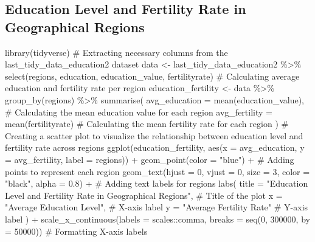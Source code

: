 \documentclass[
  11pt,
  a4paper,
  DIV=11,
  numbers=noendperiod]{scrartcl}
\newenvironment{Shaded}{\begin{snugshade}}{\end{snugshade}}
\newcommand{\AttributeTok}[1]{\textcolor[rgb]{0.40,0.45,0.13}{#1}}
\newcommand{\CommentTok}[1]{\textcolor[rgb]{0.37,0.37,0.37}{#1}}
\newcommand{\DecValTok}[1]{\textcolor[rgb]{0.68,0.00,0.00}{#1}}
\newcommand{\FloatTok}[1]{\textcolor[rgb]{0.68,0.00,0.00}{#1}}
\newcommand{\FunctionTok}[1]{\textcolor[rgb]{0.28,0.35,0.67}{#1}}
\newcommand{\NormalTok}[1]{\textcolor[rgb]{0.00,0.23,0.31}{#1}}
\newcommand{\OtherTok}[1]{\textcolor[rgb]{0.00,0.23,0.31}{#1}}
\newcommand{\SpecialCharTok}[1]{\textcolor[rgb]{0.37,0.37,0.37}{#1}}
\newcommand{\StringTok}[1]{\textcolor[rgb]{0.13,0.47,0.30}{#1}}
\begin{document}
\hypertarget{education-level-and-fertility-rate-in-geographical-regions}{%
\subsection{Education Level and Fertility Rate in Geographical
Regions}\label{education-level-and-fertility-rate-in-geographical-regions}}

\begin{Shaded}
\begin{Highlighting}[]
\FunctionTok{library}\NormalTok{(tidyverse)}
\CommentTok{\# Extracting necessary columns from the \textquotesingle{}last\_tidy\_data\_education2\textquotesingle{} dataset}
\NormalTok{data }\OtherTok{\textless{}{-}}\NormalTok{ last\_tidy\_data\_education2 }\SpecialCharTok{\%\textgreater{}\%}
  \FunctionTok{select}\NormalTok{(regions, education, education\_value, fertilityrate) }
\CommentTok{\# Calculating average education and fertility rate per region}
\NormalTok{education\_fertility }\OtherTok{\textless{}{-}}\NormalTok{ data }\SpecialCharTok{\%\textgreater{}\%}
  \FunctionTok{group\_by}\NormalTok{(regions) }\SpecialCharTok{\%\textgreater{}\%}
  \FunctionTok{summarise}\NormalTok{(}
    \AttributeTok{avg\_education =} \FunctionTok{mean}\NormalTok{(education\_value),  }\CommentTok{\# Calculating the mean education value for each region}
    \AttributeTok{avg\_fertility =} \FunctionTok{mean}\NormalTok{(fertilityrate)     }\CommentTok{\# Calculating the mean fertility rate for each region}
\NormalTok{  )}
\CommentTok{\# Creating a scatter plot to visualize the relationship between education level and fertility rate across regions}
\FunctionTok{ggplot}\NormalTok{(education\_fertility, }\FunctionTok{aes}\NormalTok{(}\AttributeTok{x =}\NormalTok{ avg\_education, }\AttributeTok{y =}\NormalTok{ avg\_fertility, }\AttributeTok{label =}\NormalTok{ regions)) }\SpecialCharTok{+}
  \FunctionTok{geom\_point}\NormalTok{(}\AttributeTok{color =} \StringTok{"blue"}\NormalTok{) }\SpecialCharTok{+}  \CommentTok{\# Adding points to represent each region}
  \FunctionTok{geom\_text}\NormalTok{(}\AttributeTok{hjust =} \DecValTok{0}\NormalTok{, }\AttributeTok{vjust =} \DecValTok{0}\NormalTok{, }\AttributeTok{size =} \DecValTok{3}\NormalTok{, }\AttributeTok{color =} \StringTok{"black"}\NormalTok{, }\AttributeTok{alpha =} \FloatTok{0.8}\NormalTok{) }\SpecialCharTok{+}  \CommentTok{\# Adding text labels for regions}
  \FunctionTok{labs}\NormalTok{(}
    \AttributeTok{title =} \StringTok{"Education Level and Fertility Rate in Geographical Regions"}\NormalTok{,  }\CommentTok{\# Title of the plot}
    \AttributeTok{x =} \StringTok{"Average Education Level"}\NormalTok{,  }\CommentTok{\# X{-}axis label}
    \AttributeTok{y =} \StringTok{"Average Fertility Rate"}     \CommentTok{\# Y{-}axis label}
\NormalTok{  ) }\SpecialCharTok{+}
  \FunctionTok{scale\_x\_continuous}\NormalTok{(}\AttributeTok{labels =}\NormalTok{ scales}\SpecialCharTok{::}\NormalTok{comma, }\AttributeTok{breaks =} \FunctionTok{seq}\NormalTok{(}\DecValTok{0}\NormalTok{, }\DecValTok{300000}\NormalTok{, }\AttributeTok{by =} \DecValTok{50000}\NormalTok{))  }\CommentTok{\# Formatting X{-}axis labels}
\end{Highlighting}
\end{Shaded}
\end{document}

